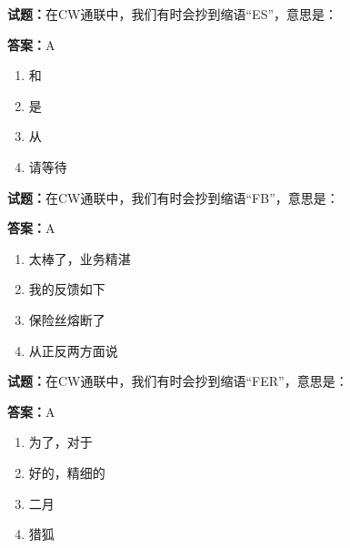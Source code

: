 \documentclass{ctexbook}
\begin{document}




\vspace{1em}

\textbf{试题：}在CW通联中，我们有时会抄到缩语“ES”，意思是： 

\textbf{答案：}A 

\begin{enumerate}[leftmargin=3em]
  \item 和 

  \item 是 

  \item 从 

  \item 请等待 

\end{enumerate}





\vspace{1em}

\textbf{试题：}在CW通联中，我们有时会抄到缩语“FB”，意思是： 

\textbf{答案：}A 

\begin{enumerate}[leftmargin=3em]
  \item 太棒了，业务精湛 

  \item 我的反馈如下 

  \item 保险丝熔断了 

  \item 从正反两方面说 

\end{enumerate}





\vspace{1em}

\textbf{试题：}在CW通联中，我们有时会抄到缩语“FER”，意思是： 

\textbf{答案：}A 

\begin{enumerate}[leftmargin=3em]
  \item 为了，对于 

  \item 好的，精细的 

  \item 二月 

  \item 猎狐 

\end{enumerate}
\end{document}
